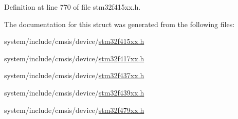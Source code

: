 Definition at line 770 of file stm32f415xx.\+h.



The documentation for this struct was generated from the following files\+:\begin{DoxyCompactItemize}
\item 
system/include/cmsis/device/\hyperlink{stm32f415xx_8h}{stm32f415xx.\+h}\item 
system/include/cmsis/device/\hyperlink{stm32f417xx_8h}{stm32f417xx.\+h}\item 
system/include/cmsis/device/\hyperlink{stm32f437xx_8h}{stm32f437xx.\+h}\item 
system/include/cmsis/device/\hyperlink{stm32f439xx_8h}{stm32f439xx.\+h}\item 
system/include/cmsis/device/\hyperlink{stm32f479xx_8h}{stm32f479xx.\+h}\end{DoxyCompactItemize}

